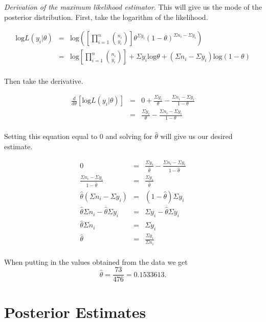 \documentclass[12pt]{article}
\begin{document}
\noindent \textit{Derivation of the maximum likelihood estimator.}  This will give us the mode of the posterior distribution.  First, take the logarithm of the likelihood.

\begin{eqnarray*}
\mathrm{log}L(y_i|\theta)&=& \mathrm{log}\left(\left[\prod_{i=1}^n{n_i \choose y_i}\right]\theta^{\Sigma y_i}(1-\theta)^{\Sigma n_i-\Sigma y_i}\right) \\
&=& \mathrm{log}\left[\prod_{i=1}^n{n_i \choose y_i}\right]+\Sigma y_i\mathrm{log}\theta+(\Sigma n_i-\Sigma y_i)\mathrm{log}(1-\theta) \\
\end{eqnarray*}

\noindent Then take the derivative.  

\begin{eqnarray*}
\frac{d}{d\theta}\left[\mathrm{log}L(y_i|\theta)\right] &=& 0 + \frac{\Sigma y_i}{\theta} - \frac{\Sigma n_i-\Sigma y_i}{1-\theta} \\
&=& \frac{\Sigma y_i}{\theta} - \frac{\Sigma n_i-\Sigma y_i}{1-\theta} \\
\end{eqnarray*}

\noindent Setting this equation equal to 0 and solving for $\hat{\theta}$ will give us our desired estimate.

\begin{eqnarray*}
0 &=& \frac{\Sigma y_i}{\hat{\theta}} - \frac{\Sigma n_i-\Sigma y_i}{1-\hat{\theta}}\\
\frac{\Sigma n_i-\Sigma y_i}{1-\hat{\theta}} &=& \frac{\Sigma y_i}{\hat{\theta}} \\
\hat{\theta}(\Sigma n_i-\Sigma y_i) &=& (1-\hat{\theta})\Sigma y_i \\
\hat{\theta}\Sigma n_i - \hat{\theta}\Sigma y_i &=& \Sigma y_i -\hat{\theta}\Sigma y_i \\
\hat{\theta}\Sigma n_i &=& \Sigma y_i \\
\hat{\theta} &=& \frac{\Sigma y_i}{\Sigma n_i} \\
\end{eqnarray*}

\noindent When putting in the values obtained from the data we get
\[\hat{\theta}=\frac{73}{476}=0.1533613.\]



\section*{Posterior Estimates}
\end{document}

